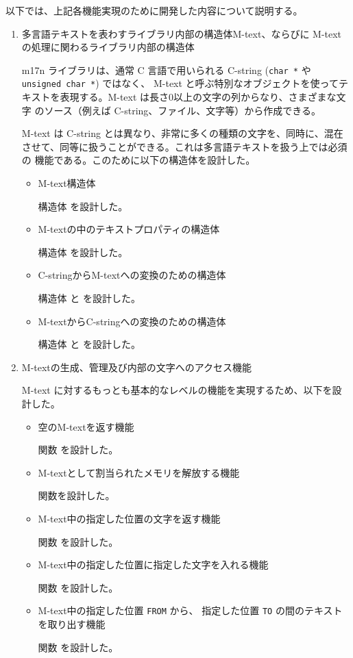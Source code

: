以下では、上記各機能実現のために開発した内容について説明する。

\begin{enumerate}

\item 多言語テキストを表わすライブラリ内部の構造体M-text、ならびに 
M-textの処理に関わるライブラリ内部の構造体

m17n ライブラリは、通常 C 言語で用いられる C-string (\texttt{char *} や 
\texttt{unsigned char *}) ではなく、 M-text と呼ぶ特別なオブジェクトを使ってテ
キストを表現する。M-text は長さ0以上の文字の列からなり、さまざまな文字
のソース（例えば C-string、ファイル、文字等）から作成できる。

M-text は C-string とは異なり、非常に多くの種類の文字を、同時に、混在
させて、同等に扱うことができる。これは多言語テキストを扱う上では必須の
機能である。このために以下の構造体を設計した。

     \begin{itemize}
     \item M-text構造体\par 構造体 を設計した。
     \item M-textの中のテキストプロパティの構造体\par 構造体 を設計した。
     \item C-stringからM-textへの変換のための構造体\par 構造体  と を設計した。
     \item M-textからC-stringへの変換のための構造体\par 構造体  と を設計した。
     \end{itemize}

\item M-textの生成、管理及び内部の文字へのアクセス機能

M-text に対するもっとも基本的なレベルの機能を実現するため、以下を設計した。 

     \begin{itemize}
     \item 空のM-textを返す機能\par 関数 を設計した。
     \item M-textとして割当られたメモリを解放する機能 \par 
           関数を設計した。
     \item M-text中の指定した位置の文字を返す機能 \par
           関数 を設計した。
     \item M-text中の指定した位置に指定した文字を入れる機能 \par
           関数 を設計した。
     \item M-text中の指定した位置 \texttt{FROM} から、
           指定した位置 \texttt{TO} の間のテキストを取り出す機能 \par
	   関数 を設計した。
     \end{itemize}


\end{enumerate}
